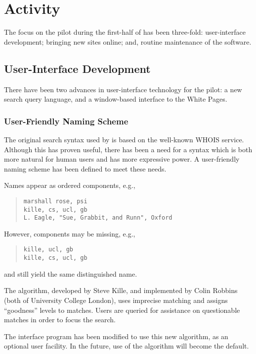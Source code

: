 
\newpage
\section	{Activity}
The focus on the pilot during the first-half of {\/} has been
three-fold:
user-interface development;
bringing new sites online;
and,
routine maintenance of the software.

\subsection	{User-Interface Development}
There have been two advances in user-interface technology for the pilot:
a new search query language,
and a window-based interface to the White Pages.

\subsubsection	{User-Friendly Naming Scheme}
The original search syntax used by  is based on the well-known WHOIS
service.
Although this has proven useful,
there has been a need for a syntax which is both more natural for human users
and has more expressive power.
A user-friendly naming scheme has been defined to meet these needs.

Names appear as ordered components,
e.g.,
\begin{quote}\small\begin{verbatim}
marshall rose, psi
kille, cs, ucl, gb
L. Eagle, "Sue, Grabbit, and Runn", Oxford
\end{verbatim}\end{quote}
However,
components may be missing,
e.g.,
\begin{quote}\small\begin{verbatim}
kille, ucl, gb
kille, cs, ucl, gb
\end{verbatim}\end{quote}
and still yield the same distinguished name.

The algorithm,
developed by Steve Kille,
and implemented by Colin Robbins
(both of University College London),
uses imprecise matching and assigns ``goodness'' levels to matches.
Users are queried for assistance on questionable matches in order to focus the
search.

The  interface program has been modified to use this new algorithm,
as an optional user facility.
In the future,
use of the algorithm will become the default.

